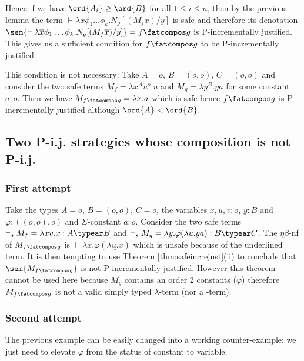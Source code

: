 Hence if we have $\ord{A_i}\geq\ord{B}$
for all $1 \leq i \leq n$,
then by the previous lemma the term $\vdash \lambda \overline{x} \phi_1 \dots \phi_k. N_g [(M_f \overline{x}) / y]$
is safe and therefore its denotation $\sem{\vdash \lambda \overline{x} \phi_1 \dots \phi_k. N_g [(M_f \overline{x}) / y]} = f\fatcompos g$ is P-incrementally justified.
This gives us a sufficient condition for $f\fatcompos g$ to be P-incrementally justified.

This condition is not necessary: Take $A=o$, $B=(o,o)$, $C=(o,o)$ and consider the two safe terms $M_f = \lambda x^A u^o.u$ and $M_g = \lambda y^B . y a$ for  some constant $a:o$. Then we have $M_{f\fatcompos g} = \lambda x . a$ which is safe hence $f\fatcompos g$ is P-incrementally justified although $\ord{A} < \ord{B}$.





\subsection{Two P-i.j. strategies whose composition is not P-i.j.}
\subsubsection{First attempt}

Take the types $A=o$, $B=(o,o)$, $C=o$, the variables
$x,u,v:o$, $y:B$ and $\varphi:((o,o),o)$ and $\Sigma$-constant $a:o$.
Consider the two safe terms $\vdash_s  M_f = \lambda xv.x : A\typear B$ and $\vdash_s M_g = \lambda y . \varphi (\lambda u . y a) : B\typear C$.
The $\eta\beta$-nf of $M_{f\fatcompos g}$ is $\vdash \lambda x . \varphi (\underline{\lambda u . x})$ which is unsafe because of the underlined term. It is then tempting to use
Theorem \ref{thm:safeincrejust}(ii) to conclude that
$\sem{M_{f\fatcompos g}}$ is not P-incrementally justified. However this theorem cannot be used here because $M_g$ contains an order $2$ constants ($\varphi$) therefore
$M_{f\fatcompos g}$ is not a valid simply typed $\lambda$-term (nor a \pcf-term).

\subsubsection{Second attempt}
The previous example can be easily changed into a working counter-example: we just need to elevate $\varphi$ from the status of constant to variable.

